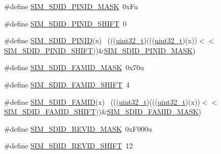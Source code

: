 \begin{DoxyCompactItemize}
\item 
\#define \hyperlink{group___s_i_m___register___masks_gaf0820acb74ce8270da2025fee624b47c}{S\+I\+M\+\_\+\+S\+D\+I\+D\+\_\+\+P\+I\+N\+I\+D\+\_\+\+M\+A\+SK}~0x\+Fu
\item 
\#define \hyperlink{group___s_i_m___register___masks_ga593faac0d0629fde52f6fe4b83614c23}{S\+I\+M\+\_\+\+S\+D\+I\+D\+\_\+\+P\+I\+N\+I\+D\+\_\+\+S\+H\+I\+FT}~0
\item 
\#define \hyperlink{group___s_i_m___register___masks_ga3ab62e28831b168141d554c707ac5c87}{S\+I\+M\+\_\+\+S\+D\+I\+D\+\_\+\+P\+I\+N\+ID}(x)                                            ~(((\hyperlink{_p_e___types_8h_a33594304e786b158f3fb30289278f5af}{uint32\+\_\+t})(((\hyperlink{_p_e___types_8h_a33594304e786b158f3fb30289278f5af}{uint32\+\_\+t})(x))$<$$<$\hyperlink{group___s_i_m___register___masks_ga593faac0d0629fde52f6fe4b83614c23}{S\+I\+M\+\_\+\+S\+D\+I\+D\+\_\+\+P\+I\+N\+I\+D\+\_\+\+S\+H\+I\+FT}))\&\hyperlink{group___s_i_m___register___masks_gaf0820acb74ce8270da2025fee624b47c}{S\+I\+M\+\_\+\+S\+D\+I\+D\+\_\+\+P\+I\+N\+I\+D\+\_\+\+M\+A\+SK})
\item 
\#define \hyperlink{group___s_i_m___register___masks_ga5344e7283b2aead14d9d3bded0114f3b}{S\+I\+M\+\_\+\+S\+D\+I\+D\+\_\+\+F\+A\+M\+I\+D\+\_\+\+M\+A\+SK}~0x70u
\item 
\#define \hyperlink{group___s_i_m___register___masks_ga377bc761e6ee1caab79baad3e2d0d331}{S\+I\+M\+\_\+\+S\+D\+I\+D\+\_\+\+F\+A\+M\+I\+D\+\_\+\+S\+H\+I\+FT}~4
\item 
\#define \hyperlink{group___s_i_m___register___masks_ga1c53c57d3312af915fc5419efec0b651}{S\+I\+M\+\_\+\+S\+D\+I\+D\+\_\+\+F\+A\+M\+ID}(x)                                            ~(((\hyperlink{_p_e___types_8h_a33594304e786b158f3fb30289278f5af}{uint32\+\_\+t})(((\hyperlink{_p_e___types_8h_a33594304e786b158f3fb30289278f5af}{uint32\+\_\+t})(x))$<$$<$\hyperlink{group___s_i_m___register___masks_ga377bc761e6ee1caab79baad3e2d0d331}{S\+I\+M\+\_\+\+S\+D\+I\+D\+\_\+\+F\+A\+M\+I\+D\+\_\+\+S\+H\+I\+FT}))\&\hyperlink{group___s_i_m___register___masks_ga5344e7283b2aead14d9d3bded0114f3b}{S\+I\+M\+\_\+\+S\+D\+I\+D\+\_\+\+F\+A\+M\+I\+D\+\_\+\+M\+A\+SK})
\item 
\#define \hyperlink{group___s_i_m___register___masks_gafefd91d0385c1b93049ec14409ed6b1e}{S\+I\+M\+\_\+\+S\+D\+I\+D\+\_\+\+R\+E\+V\+I\+D\+\_\+\+M\+A\+SK}~0x\+F000u
\item 
\#define \hyperlink{group___s_i_m___register___masks_gadb535428e0ca83d2494493ed04822b8c}{S\+I\+M\+\_\+\+S\+D\+I\+D\+\_\+\+R\+E\+V\+I\+D\+\_\+\+S\+H\+I\+FT}~12

\end{DoxyCompactItemize}

